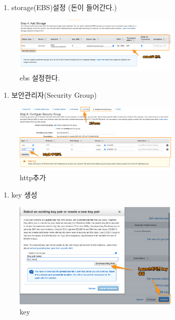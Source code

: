\documentclass[11pt]{article}
\begin{document}
\begin{enumerate}
\item storage(EBS)설정 (돈이 들어간다.)
\end{enumerate}
\begin{figure}[htbp]
\centering
\includegraphics[width=300px]{./img/default.png}
\caption{\label{fig:orgf2edd67}ebs  설정한다.}
\end{figure}

\begin{enumerate}
\item 보안관리자(Security Group)
\end{enumerate}
\begin{figure}[htbp]
\centering
\includegraphics[width=300px]{./img/network.png}
\caption{\label{fig:org14bf488}http추가}
\end{figure}

\begin{enumerate}
\item key 생성
\end{enumerate}
\begin{figure}[htbp]
\centering
\includegraphics[width=300px]{./img/key.png}
\caption{\label{fig:org6519da2}key}
\end{figure}
\end{document}

